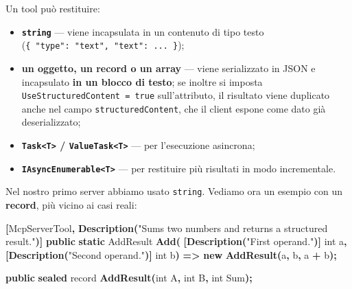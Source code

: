 \documentclass[
  italian,
  10pt,
]{book}
\newenvironment{Shaded}{\begin{snugshade}}{\end{snugshade}}
\newcommand{\DataTypeTok}[1]{\textcolor[rgb]{0.13,0.29,0.53}{#1}}
\newcommand{\FunctionTok}[1]{\textcolor[rgb]{0.13,0.29,0.53}{\textbf{#1}}}
\newcommand{\KeywordTok}[1]{\textcolor[rgb]{0.13,0.29,0.53}{\textbf{#1}}}
\newcommand{\NormalTok}[1]{#1}
\newcommand{\OperatorTok}[1]{\textcolor[rgb]{0.81,0.36,0.00}{\textbf{#1}}}
\newcommand{\StringTok}[1]{\textcolor[rgb]{0.31,0.60,0.02}{#1}}
\providecommand{\tightlist}{%
  \setlength{\itemsep}{0pt}\setlength{\parskip}{0pt}}
\begin{document}
Un tool può restituire:

\begin{itemize}
\tightlist
\item
  \textbf{\texttt{string}} --- viene incapsulata in un contenuto di tipo
  testo (\texttt{\{\ "type":\ "text",\ "text":\ ...\ \}});
\item
  \textbf{un oggetto, un record o un array} --- viene serializzato in
  JSON e incapsulato \textbf{in un blocco di testo}; se inoltre si
  imposta \texttt{UseStructuredContent\ =\ true} sull'attributo, il
  risultato viene duplicato anche nel campo \texttt{structuredContent},
  che il client espone come dato già deserializzato;
\item
  \textbf{\texttt{Task\textless{}T\textgreater{}} /
  \texttt{ValueTask\textless{}T\textgreater{}}} --- per l'esecuzione
  asincrona;
\item
  \textbf{\texttt{IAsyncEnumerable\textless{}T\textgreater{}}} --- per
  restituire più risultati in modo incrementale.
\end{itemize}

Nel nostro primo server abbiamo usato \texttt{string}. Vediamo ora un
esempio con un \textbf{record}, più vicino ai casi reali:

\begin{Shaded}
\begin{Highlighting}[]
\OperatorTok{[}\NormalTok{McpServerTool}\OperatorTok{,} \FunctionTok{Description}\OperatorTok{(}\StringTok{"Sums two numbers and returns a structured result."}\OperatorTok{)]}
\KeywordTok{public} \KeywordTok{static}\NormalTok{ AddResult }\FunctionTok{Add}\OperatorTok{(}
    \OperatorTok{[}\FunctionTok{Description}\OperatorTok{(}\StringTok{"First operand."}\OperatorTok{)]} \DataTypeTok{int}\NormalTok{ a}\OperatorTok{,}
    \OperatorTok{[}\FunctionTok{Description}\OperatorTok{(}\StringTok{"Second operand."}\OperatorTok{)]} \DataTypeTok{int}\NormalTok{ b}\OperatorTok{)}
    \OperatorTok{=\textgreater{}} \KeywordTok{new} \FunctionTok{AddResult}\OperatorTok{(}\NormalTok{a}\OperatorTok{,}\NormalTok{ b}\OperatorTok{,}\NormalTok{ a }\OperatorTok{+}\NormalTok{ b}\OperatorTok{);}

\KeywordTok{public} \KeywordTok{sealed}\NormalTok{ record }\FunctionTok{AddResult}\OperatorTok{(}\DataTypeTok{int}\NormalTok{ A}\OperatorTok{,} \DataTypeTok{int}\NormalTok{ B}\OperatorTok{,} \DataTypeTok{int}\NormalTok{ Sum}\OperatorTok{);}
\end{Highlighting}
\end{Shaded}
\end{document}

